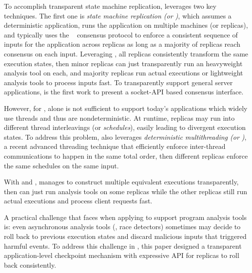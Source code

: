 To accomplish transparent state machine replication, \repbox leverages two key 
techniques. The first one is \emph{state machine replication (or \smr)}, which assumes a deterministic 
application, runs the application on multiple machines (or replicas), and 
typically uses the \paxos~\cite{paxos} consensus protocol to enforce a 
consistent sequence of inputs for the application across replicas as long as a 
majority of replicas reach consensus on each input. Leveraging \smr, all 
replicas consistently transform the same execution states, then minor replicas 
can just transparently run an heavyweight analysis tool on each, and majority 
replicas run actual executions or lightweight analysis tools to process inputs 
fast. To transparently support general server applications, \repbox is the 
first work to present a socket-API based \paxos consensus interface.


However, for \repbox, \smr alone is not sufficient to support today's 
applications which widely use threads and thus are nondeterministic. At runtime, 
replicas may run into different thread interleavings (or \emph{schedules}), 
easily leading to divergent execution states. To address this problem, \repbox 
also leverages \emph{deterministic multithreading (or \dmt)}, a recent advanced 
threading technique that efficiently enforce inter-thread communications to 
happen in the same total order, then different replicas enforce the same schedules 
on the same input.

With \smr and \dmt, \repbox manages to construct multiple equivalent executions 
transparently, then \xxx can just run analysis tools on some replicas while the other replicas 
still run actual executions and process client requests fast.


A practical challenge that faces \xxx when applying \repbox to support program 
analysis tools is: even asynchronous analysis tools (\eg, race detectors) 
sometimes may decide to roll back to previous execution states and discard 
malicious inputs that triggered harmful events. To address this challenge in 
\xxx, this paper designed a transparent application-level checkpoint mechanism 
with expressive API for replicas to roll back consistently.



